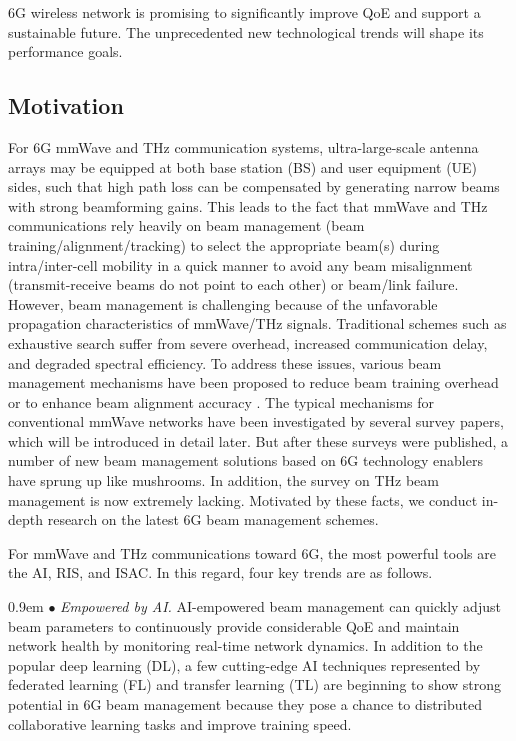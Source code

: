 \documentclass[journal,comsoc]{IEEEtran}
\begin{document}
6G wireless network is promising to significantly improve QoE and support a sustainable future. The unprecedented new technological trends will shape its performance goals.


\subsection{Motivation}
For 6G mmWave and THz communication systems, ultra-large-scale antenna arrays may be equipped at both base station (BS) and user equipment (UE) sides, such that high path loss can be compensated by generating narrow beams with strong beamforming gains. This leads to the fact that mmWave and THz communications rely heavily on beam management (beam training/alignment/tracking) to select the appropriate beam(s) during intra/inter-cell mobility in a quick manner to avoid any beam misalignment (transmit-receive beams do not point to each other) or beam/link failure. However, beam management is challenging because of the unfavorable propagation characteristics of mmWave/THz signals. Traditional schemes such as exhaustive search suffer from severe overhead, increased communication delay, and degraded spectral efficiency. To address these issues, various beam management mechanisms have been proposed to reduce beam training overhead or to enhance beam alignment accuracy \cite{Beamspace-SU-MIMO-2017,Beamspace-MU-MIMO-2019,User-Centric-Association-Ultra-Dense-mmWave-2021,XUE20221115,Beam-Management-Ultra-Dense-mmWave-Network-2023}. The typical mechanisms for conventional mmWave networks have been investigated by several survey papers, which will be introduced in detail later. But after these surveys were published, a number of new beam management solutions based on 6G technology enablers have sprung up like mushrooms. In addition, the survey on THz beam management is now extremely lacking. Motivated by these facts, we conduct in-depth research on the latest 6G beam management schemes.

For mmWave and THz communications toward 6G, the most powerful tools are the AI, RIS, and ISAC. In this regard, four key trends are as follows.

\hangindent 0.9em
\noindent
$\bullet$ \emph{Empowered by AI.} AI-empowered beam management can quickly adjust beam parameters to continuously provide considerable QoE and maintain network health by monitoring real-time network dynamics. In addition to the popular deep learning (DL), a few cutting-edge AI techniques represented by federated learning (FL) and transfer learning (TL) are beginning to show strong potential in 6G beam management because they pose a chance to distributed collaborative learning tasks and improve training speed.
\end{document}
